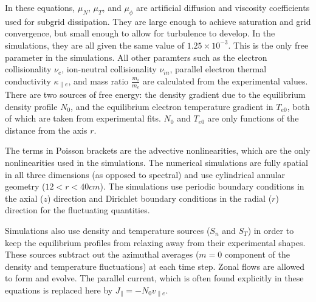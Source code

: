 \documentclass[showpacs,preprintnumbers,amsmath,amssymb,superscriptaddress]{revtex4}
\def\para{\parallel}
\newcommand{\vpe}{v_{\parallel e}}
\newcommand{\nue}{\nu_{e}}
\newcommand{\nuin}{\nu_{in}}
\newcommand{\kpe}{\kappa_{\parallel e}}
\newcommand{\fmie}{\frac{m_i}{m_e}}
\begin{document}
In these equations, $\mu_N$, $\mu_T$, and $\mu_\phi$ are artificial diffusion and viscosity coefficients used for subgrid dissipation. They are large enough to achieve saturation
and grid convergence, but small enough to allow for turbulence to develop. In the simulations, they are all given the same value of $1.25 \times 10^{-3}$. This is the only free
parameter in the simulations. All other paramters such as the electron collisionality $\nue$, ion-neutral
collisionality $\nuin$, parallel electron thermal conductivity $\kpe$, and mass ratio $\fmie$ are calculated from the experimental values.
There are two sources of free energy: the density gradient due to the equilibrium density profile $N_0$, and the equilibrium electron temperature gradient in $T_{e0}$, both of which are
taken from experimental fits. $N_0$ and $T_{e0}$ are only functions of the distance from the axis $r$. 

The terms in Poisson brackets are the advective nonlinearities, which are the only nonlinearities used in the simulations.
The numerical simulations are fully spatial in all three dimensions (as opposed to spectral) and use cylindrical annular geometry ($12<r<40 cm$).
The simulations use periodic boundary conditions in the axial ($z$) direction and Dirichlet boundary
conditions in the radial ($r$) direction for the fluctuating quantities. 

Simulations also use density and temperature sources ($S_n$ and $S_T$) in order to keep the equilibrium profiles from relaxing away from their experimental shapes. 
These sources subtract out the azimuthal averages ($m=0$ component of the density and temperature fluctuations) at each time step. 
Zonal flows are allowed to form and evolve. The parallel current, which is often found explicitly in these equations is replaced here by $J_\para = - N_0 \vpe$. \\
\end{document}
